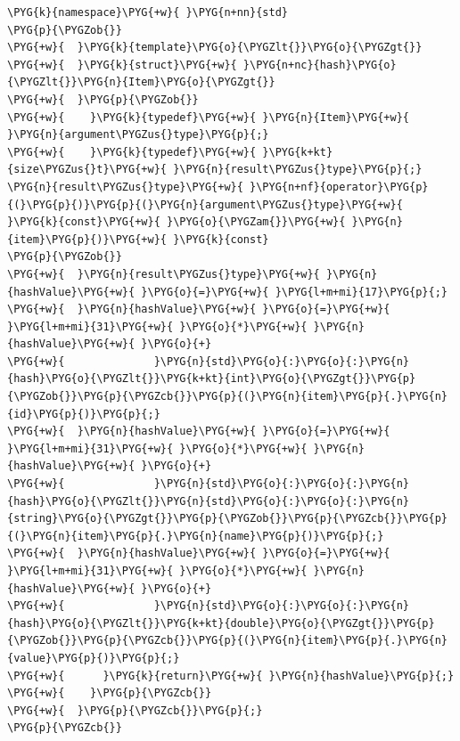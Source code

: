 \begin{codeblockbg}
\begin{Verbatim}[commandchars=\\\{\},breaklines=true,breakanywhere=true,fontsize=\codefont,xleftmargin=17bp]
\PYG{k}{namespace}\PYG{+w}{ }\PYG{n+nn}{std}
\PYG{p}{\PYGZob{}}
\PYG{+w}{  }\PYG{k}{template}\PYG{o}{\PYGZlt{}}\PYG{o}{\PYGZgt{}}
\PYG{+w}{  }\PYG{k}{struct}\PYG{+w}{ }\PYG{n+nc}{hash}\PYG{o}{\PYGZlt{}}\PYG{n}{Item}\PYG{o}{\PYGZgt{}}
\PYG{+w}{  }\PYG{p}{\PYGZob{}}
\PYG{+w}{    }\PYG{k}{typedef}\PYG{+w}{ }\PYG{n}{Item}\PYG{+w}{ }\PYG{n}{argument\PYGZus{}type}\PYG{p}{;}
\PYG{+w}{    }\PYG{k}{typedef}\PYG{+w}{ }\PYG{k+kt}{size\PYGZus{}t}\PYG{+w}{ }\PYG{n}{result\PYGZus{}type}\PYG{p}{;}
\PYG{n}{result\PYGZus{}type}\PYG{+w}{ }\PYG{n+nf}{operator}\PYG{p}{(}\PYG{p}{)}\PYG{p}{(}\PYG{n}{argument\PYGZus{}type}\PYG{+w}{ }\PYG{k}{const}\PYG{+w}{ }\PYG{o}{\PYGZam{}}\PYG{+w}{ }\PYG{n}{item}\PYG{p}{)}\PYG{+w}{ }\PYG{k}{const}
\PYG{p}{\PYGZob{}}
\PYG{+w}{  }\PYG{n}{result\PYGZus{}type}\PYG{+w}{ }\PYG{n}{hashValue}\PYG{+w}{ }\PYG{o}{=}\PYG{+w}{ }\PYG{l+m+mi}{17}\PYG{p}{;}
\PYG{+w}{  }\PYG{n}{hashValue}\PYG{+w}{ }\PYG{o}{=}\PYG{+w}{ }\PYG{l+m+mi}{31}\PYG{+w}{ }\PYG{o}{*}\PYG{+w}{ }\PYG{n}{hashValue}\PYG{+w}{ }\PYG{o}{+}
\PYG{+w}{              }\PYG{n}{std}\PYG{o}{:}\PYG{o}{:}\PYG{n}{hash}\PYG{o}{\PYGZlt{}}\PYG{k+kt}{int}\PYG{o}{\PYGZgt{}}\PYG{p}{\PYGZob{}}\PYG{p}{\PYGZcb{}}\PYG{p}{(}\PYG{n}{item}\PYG{p}{.}\PYG{n}{id}\PYG{p}{)}\PYG{p}{;}
\PYG{+w}{  }\PYG{n}{hashValue}\PYG{+w}{ }\PYG{o}{=}\PYG{+w}{ }\PYG{l+m+mi}{31}\PYG{+w}{ }\PYG{o}{*}\PYG{+w}{ }\PYG{n}{hashValue}\PYG{+w}{ }\PYG{o}{+}
\PYG{+w}{              }\PYG{n}{std}\PYG{o}{:}\PYG{o}{:}\PYG{n}{hash}\PYG{o}{\PYGZlt{}}\PYG{n}{std}\PYG{o}{:}\PYG{o}{:}\PYG{n}{string}\PYG{o}{\PYGZgt{}}\PYG{p}{\PYGZob{}}\PYG{p}{\PYGZcb{}}\PYG{p}{(}\PYG{n}{item}\PYG{p}{.}\PYG{n}{name}\PYG{p}{)}\PYG{p}{;}
\PYG{+w}{  }\PYG{n}{hashValue}\PYG{+w}{ }\PYG{o}{=}\PYG{+w}{ }\PYG{l+m+mi}{31}\PYG{+w}{ }\PYG{o}{*}\PYG{+w}{ }\PYG{n}{hashValue}\PYG{+w}{ }\PYG{o}{+}
\PYG{+w}{              }\PYG{n}{std}\PYG{o}{:}\PYG{o}{:}\PYG{n}{hash}\PYG{o}{\PYGZlt{}}\PYG{k+kt}{double}\PYG{o}{\PYGZgt{}}\PYG{p}{\PYGZob{}}\PYG{p}{\PYGZcb{}}\PYG{p}{(}\PYG{n}{item}\PYG{p}{.}\PYG{n}{value}\PYG{p}{)}\PYG{p}{;}
\PYG{+w}{      }\PYG{k}{return}\PYG{+w}{ }\PYG{n}{hashValue}\PYG{p}{;}
\PYG{+w}{    }\PYG{p}{\PYGZcb{}}
\PYG{+w}{  }\PYG{p}{\PYGZcb{}}\PYG{p}{;}
\PYG{p}{\PYGZcb{}}
\end{Verbatim}
\end{codeblockbg}



